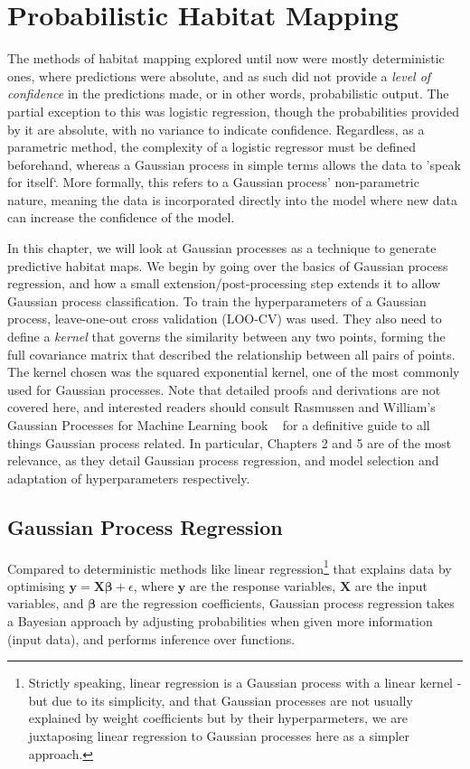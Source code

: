 \chapter{Probabilistic Habitat Mapping} \label{chap:gps}

The methods of habitat mapping explored until now were mostly deterministic ones, where predictions were absolute, and as such did not provide a \textit{level of confidence} in the predictions made, or in other words, probabilistic output. The partial exception to this was logistic regression, though the probabilities provided by it are absolute, with no variance to indicate confidence. Regardless, as a parametric method, the complexity of a logistic regressor must be defined beforehand, whereas a Gaussian process in simple terms allows the data to 'speak for itself`. More formally, this refers to a Gaussian process' non-parametric nature, meaning the data is incorporated directly into the model where new data can increase the confidence of the model.

In this chapter, we will look at Gaussian processes as a technique to generate predictive habitat maps. We begin by going over the basics of Gaussian process regression, and how a small extension/post-processing step extends it to allow Gaussian process classification. To train the hyperparameters of a Gaussian process, leave-one-out cross validation (LOO-CV) was used. They also need to define a \textit{kernel} that governs the similarity between any two points, forming the full covariance matrix that described the relationship between all pairs of points. The kernel chosen was the squared exponential kernel, one of the most commonly used for Gaussian processes. Note that detailed proofs and derivations are not covered here, and interested readers should consult Rasmussen and William's Gaussian Processes for Machine Learning book ~\citep{rasmussen06} for a definitive guide to all things Gaussian process related. In particular, Chapters 2 and 5 are of the most relevance, as they detail Gaussian process regression, and model selection and adaptation of hyperparameters respectively.

 \section{Gaussian Process Regression}\label{chapsec:gpr}

Compared to deterministic methods like linear regression\footnote{Strictly speaking, linear regression is a Gaussian process with a linear kernel - but due to its simplicity, and that Gaussian processes are not usually explained by weight coefficients but by their hyperparmeters, we are juxtaposing linear regression to Gaussian processes here as a simpler approach.} that explains data by optimising $\mathbf{y=X\beta} + \epsilon$, where $\mathbf{y}$ are the response variables, $\mathbf{X}$ are the input variables, and $\mathbf{\beta}$ are the regression coefficients, Gaussian process regression takes a Bayesian approach by adjusting probabilities when given more information (input data), and performs inference over functions.

